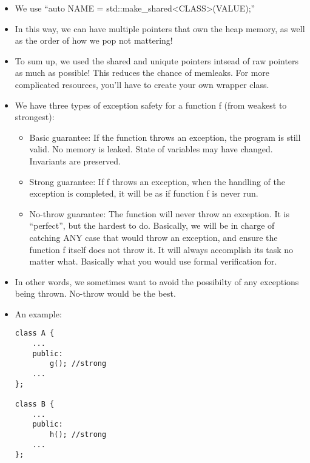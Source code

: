 \documentclass{article}
\begin{document}
\begin{itemize}
\item We use ``auto NAME = std::make\_shared<CLASS>(VALUE);''
\item In this way, we can have multiple pointers that own the heap memory, as well as the order of how we pop not mattering!
\item To sum up, we used the shared and uniqute pointers intsead of raw pointers as much as possible!  This reduces the chance of memleaks.  For more complicated resources, you'll have to create your own wrapper class.
\item We have three types of exception safety for a function f (from weakest to strongest):
\begin{itemize}
\item Basic guarantee: If the function throws an exception, the program is still valid.  No memory is leaked.  State of variables may have changed.  Invariants are preserved.
\item Strong guarantee:  If f throws an exception, when the handling of the exception is completed, it will be as if function f is never run.
\item No-throw guarantee:  The function will never throw an exception.  It is ``perfect'', but the hardest to do.  Basically, we will be in charge of catching ANY case that would throw an exception, and ensure the function f itself does not throw it.  It will always accomplish its task no matter what.  Basically what you would use formal verification for.
\end{itemize}
\item In other words, we sometimes want to avoid the possibilty of any exceptions being thrown.  No-throw would be the best.
\item An example:
\begin{lstlisting}
class A {
    ...
    public:
        g(); //strong
    ...
};

class B {
    ...
    public:
        h(); //strong
    ...
};


\end{lstlisting}
\end{itemize}
\end{document}
